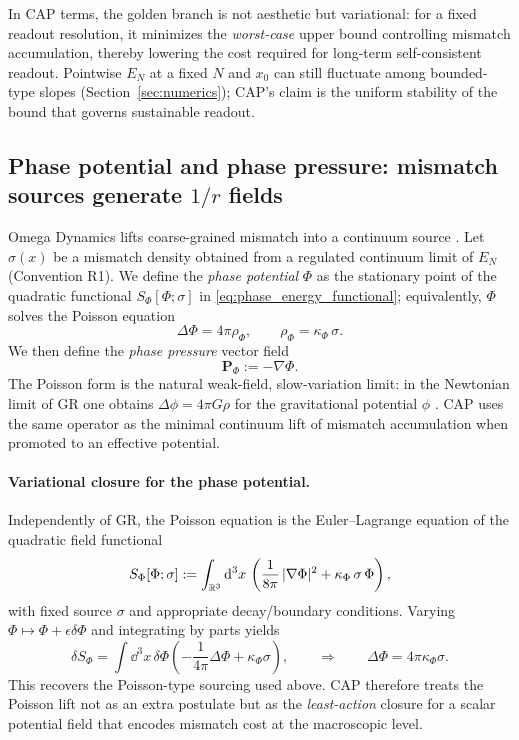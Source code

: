 \noindent In CAP terms, the golden branch is not aesthetic but variational: for a fixed readout resolution, it minimizes the \emph{worst-case} upper bound controlling mismatch accumulation, thereby lowering the cost required for long-term self-consistent readout. Pointwise $E_N$ at a fixed $N$ and $x_0$ can still fluctuate among bounded-type slopes (Section~\ref{sec:numerics}); CAP's claim is the uniform stability of the bound that governs sustainable readout.

\subsection{Phase potential and phase pressure: mismatch sources generate \texorpdfstring{$1/r$}{1/r} fields}
\label{subsec:phase_potential}

Omega Dynamics lifts coarse-grained mismatch into a continuum source \cite{Ma2025HPD}. Let $\sigma(x)$ be a mismatch density obtained from a regulated continuum limit of $E_N$ (Convention R1). We define the \emph{phase potential} $\Phi$ as the stationary point of the quadratic functional $S_\Phi[\Phi;\sigma]$ in \eqref{eq:phase_energy_functional}; equivalently, $\Phi$ solves the Poisson equation
\begin{equation}
  \Delta \Phi = 4\pi \rho_{\Phi},
  \qquad
  \rho_{\Phi} = \kappa_{\Phi}\, \sigma .
\end{equation}
We then define the \emph{phase pressure} vector field
\begin{equation}
  \mathbf{P}_{\Phi} := -\nabla \Phi .
\end{equation}
The Poisson form is the natural weak-field, slow-variation limit: in the Newtonian limit of GR one obtains $\Delta\phi=4\pi G\rho$ for the gravitational potential $\phi$ \cite{Wald1984,Carroll2004}. CAP uses the same operator as the minimal continuum lift of mismatch accumulation when promoted to an effective potential.

\paragraph{Variational closure for the phase potential.}
Independently of GR, the Poisson equation is the Euler--Lagrange equation of the quadratic field functional
\begin{equation}
\label{eq:phase_energy_functional}
  S_{\Phi}[\Phi;\sigma]
  := \int_{\mathbb{R}^{3}}\mathrm{d}^{3}x\,
  \left(
    \frac{1}{8\pi}\,|\nabla\Phi|^{2}
    + \kappa_{\Phi}\,\sigma\,\Phi
  \right),
\end{equation}
with fixed source $\sigma$ and appropriate decay/boundary conditions. Varying $\Phi\mapsto\Phi+\epsilon \delta\Phi$ and integrating by parts yields
\begin{equation}
  \delta S_{\Phi}
  = \int \dd^{3}x\,\delta\Phi\left(-\frac{1}{4\pi}\Delta\Phi+\kappa_{\Phi}\sigma\right),
  \qquad\Rightarrow\qquad
  \Delta\Phi = 4\pi\kappa_{\Phi}\sigma.
\end{equation}
This recovers the Poisson-type sourcing used above. CAP therefore treats the Poisson lift not as an extra postulate but as the \emph{least-action} closure for a scalar potential field that encodes mismatch cost at the macroscopic level.

